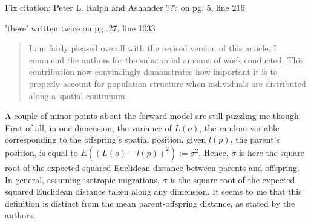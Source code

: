 

\begin{point}{}
 Fix citation: Peter L. Ralph and Ashander ??? on pg. 5, line 216
\end{point}


\begin{point}{}
'there' written twice on pg. 27, line 1033
\end{point}







\begin{quote}
I am fairly pleased overall with the revised version of this article. I commend the authors for the substantial amount of work conducted. This contribution now convincingly demonstrates how important it is to properly account for population structure when individuals are distributed along a spatial continuum.
\end{quote}

\begin{point}{}
A couple of minor points about the forward model are still puzzling me though. First of all, in one dimension, the variance of $L(o)$, the random variable corresponding to the offspring's spatial position, given $l(p)$, the parent's position, is equal to $E((L(o)-l(p))^2):=\sigma^2$. Hence, $\sigma$ is here the square root of the expected squared Euclidean distance between parents and offspring. In general, assuming isotropic migrations, $\sigma$ is the square root of the expected squared Euclidean distance taken along any dimension. It seems to me that this definition is distinct from the mean parent-offspring distance, as stated by the authors.
\end{point}


